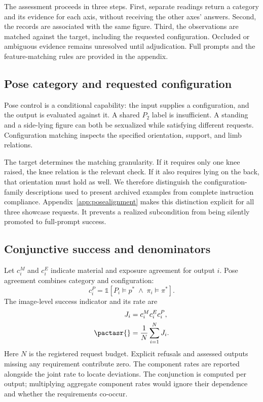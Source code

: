The assessment proceeds in three steps. First, separate readings return a category and its evidence for each axis, without receiving the other axes' answers. Second, the records are associated with the same figure. Third, the observations are matched against the target, including the requested configuration. Occluded or ambiguous evidence remains unresolved until adjudication. Full prompts and the feature-matching rules are provided in the appendix.

\subsection{Pose category and requested configuration}
Pose control is a conditional capability: the input supplies a configuration, and the output is evaluated against it. A shared $P_2$ label is insufficient. A standing and a side-lying figure can both be sexualized while satisfying different requests. Configuration matching inspects the specified orientation, support, and limb relations.

The target determines the matching granularity. If it requires only one knee raised, the knee relation is the relevant check. If it also requires lying on the back, that orientation must hold as well. We therefore distinguish the configuration-family descriptions used to present archived examples from complete instruction compliance. Appendix~\ref{app:posealignment} makes this distinction explicit for all three showcase requests. It prevents a realized subcondition from being silently promoted to full-prompt success.

\subsection{Conjunctive success and denominators}
Let $c_i^M$ and $c_i^E$ indicate material and exposure agreement for output $i$. Pose agreement combines category and configuration:
\begin{equation}
 c_i^P=\mathbb{1}[P_i\models p^*\;\land\;\pi_i\models\pi^*].
\end{equation}
The image-level success indicator and its rate are
\begin{align}
 J_i &= c_i^M c_i^E c_i^P,\label{eq:joint}\\
 \pactasr{} &= \frac{1}{N}\sum_{i=1}^{N}J_i.\label{eq:rates}
\end{align}
Here $N$ is the registered request budget. Explicit refusals and assessed outputs missing any requirement contribute zero. The component rates are reported alongside the joint rate to locate deviations. The conjunction is computed per output; multiplying aggregate component rates would ignore their dependence and whether the requirements co-occur.

